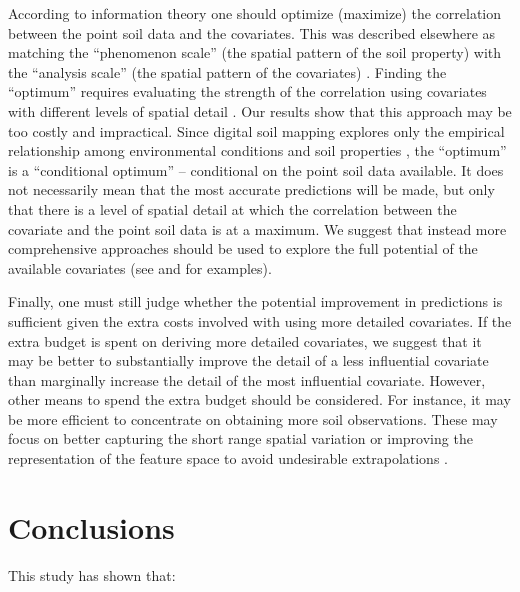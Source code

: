 According to information theory one should optimize (maximize) the correlation between the point soil data and 
the covariates. This was described elsewhere as matching the ``phenomenon scale'' (the spatial pattern of the 
soil property) with the ``analysis scale'' (the spatial pattern of the covariates) \cite{DunganEtAl2002, 
MillerEtAl2014}. Finding the ``optimum'' requires evaluating the strength of the correlation using covariates 
with different levels of spatial detail \cite{DragutEtAl2009, CavazziEtAl2013, MillerEtAl2015}. Our results 
show that this approach may be too costly and impractical. Since digital soil mapping explores only the 
empirical relationship among environmental conditions and soil properties \cite{Grunwald2009}, the ``optimum'' 
is a ``conditional optimum'' -- conditional on the point soil data available. It does not necessarily mean that 
the most accurate predictions will be made, but only that there is a level of spatial detail at which the 
correlation between the covariate and the point soil data is at a maximum. We suggest that instead more 
comprehensive approaches should be used to explore the full potential of the available covariates (see 
 and  for examples).

Finally, one must still judge whether the potential improvement in predictions is sufficient given the extra 
costs involved with using more detailed covariates. If the extra budget is spent on deriving more detailed 
covariates, we suggest that it may be better to substantially improve the detail of a less influential
covariate than marginally increase the detail of the most influential covariate. However, other means to spend 
the extra budget should be considered. For instance, it may be more efficient to concentrate on obtaining more 
soil observations. These may focus on better capturing the short range spatial variation \cite{BrusEtAl2007a} 
or improving the representation of the feature space to avoid undesirable extrapolations 
\cite{MinasnyEtAl2006b}.

\section{Conclusions}

This study has shown that:

